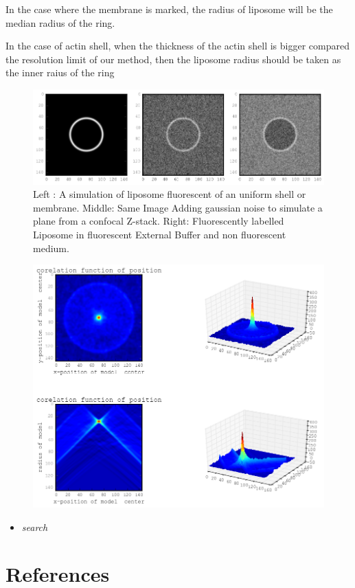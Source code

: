 \documentclass[A4paperpaper,11pt,english]{sphinxmanual}
\begin{document}
In the case where the membrane is marked, the radius of liposome will be the median radius of the ring.

In the case of actin shell, when the thickness of the actin shell is bigger compared the resolution limit of our method, then the liposome radius should be taken as the inner raius of the ring
\begin{figure}[htbp]
\centering
\capstart

\includegraphics{modl-2d-doublet.png}
\caption{Left : A simulation of liposome fluorescent of an uniform shell or
membrane.
Middle: Same Image Adding gaussian noise to simulate a plane from
a confocal Z-stack.
Right: Fluorescently labelled Liposome in fluorescent External Buffer
and non fluorescent medium.}\end{figure}
\begin{figure}[htbp]
\centering

\includegraphics{corrfun-noise-.png}
\end{figure}
\begin{itemize}
\item {} 
\emph{search}

\end{itemize}


\chapter{References}
\label{index-latex:references}




\renewcommand{\indexname}{Index}
\printindex
\end{document}
